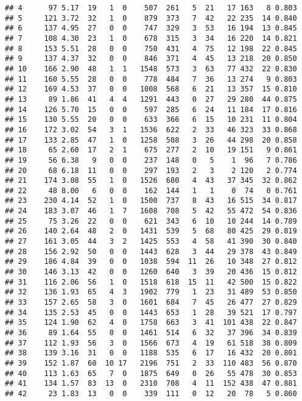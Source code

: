 \documentclass[]{article}
\begin{document}
\begin{verbatim}
## 4      97 5.17  19   1  0    507  261   5  21   17 163   8 0.803
## 5     121 3.72  32   1  0    879  373   7  42   22 235  14 0.840
## 6     137 4.95  27   0  0    747  329   3  53   16 194  13 0.845
## 7     108 4.30  23   1  0    678  315   3  34   16 220  14 0.821
## 8     153 5.51  28   0  0    750  431   4  75   12 198  22 0.845
## 9     137 4.37  32   0  0    846  371   4  45   13 218  20 0.850
## 10    166 2.90  48   1  1   1548  573   3  63   77 432  22 0.830
## 11    160 5.55  28   0  0    778  484   7  36   13 274   9 0.803
## 12    169 4.53  37   0  0   1008  568   6  21   13 357  15 0.810
## 13     89 1.86  41   4  4   1291  443   0  27   29 280  44 0.875
## 14    126 5.70  15   0  0    597  285   6  24   11 184  17 0.816
## 15    130 5.55  20   0  0    633  366   6  15   10 231  11 0.804
## 16    172 3.02  54   3  1   1536  622   2  33   46 323  33 0.868
## 17    133 2.85  47   1  0   1258  508   3  26   44 298  20 0.858
## 18     65 2.60  17   2  1    675  277   2  10   19 151   9 0.861
## 19     56 6.38   9   0  0    237  148   0   5    1  96   7 0.786
## 20     68 6.18  11   0  0    297  193   2   3    2 120   2 0.774
## 21    174 3.08  55   1  0   1526  680   4  43   37 345  32 0.862
## 22     48 8.00   6   0  0    162  144   1   1    0  74   0 0.761
## 23    230 4.14  52   1  0   1500  737   8  43   16 515  34 0.817
## 24    183 3.07  46   1  7   1608  708   5  42   55 472  54 0.836
## 25     75 3.26  22   0  0    621  343   6  10   10 244  14 0.789
## 26    140 2.64  48   2  0   1431  539   5  68   80 425  29 0.819
## 27    161 3.05  44   3  2   1425  553   4  58   41 390  30 0.840
## 28    156 2.92  50   0  0   1443  628   3  44   29 378  43 0.849
## 29    186 4.84  39   0  0   1038  594  11  26   10 348  27 0.812
## 30    146 3.13  42   0  0   1260  640   3  39   20 436  15 0.812
## 31    116 2.06  56   1  0   1518  618  15  11   42 500  15 0.822
## 32    136 1.93  65   4  3   1902  779   1  23   31 489  53 0.850
## 33    157 2.65  58   3  0   1601  684   7  45   26 477  27 0.829
## 34    135 2.53  45   0  0   1443  653   1  28   39 521  17 0.797
## 35    124 1.90  62   4  0   1758  663   3  41  101 438  22 0.847
## 36     89 1.64  55   0  0   1461  514   6  32   37 396  34 0.839
## 37    112 1.93  56   3  0   1566  673   4  19   61 518  38 0.809
## 38    139 3.16  31   0  0   1188  535   6  17   16 432  20 0.801
## 39    152 1.87  60  10 17   2196  751   2  33  110 483  56 0.870
## 40    113 1.63  65   7  0   1875  649   0  26   55 478  30 0.853
## 41    134 1.57  83  13  0   2310  708   4  11  152 438  47 0.881
## 42     23 1.83  13   0  0    339  111   0  12   20  78   5 0.860

\end{verbatim}
\end{document}
